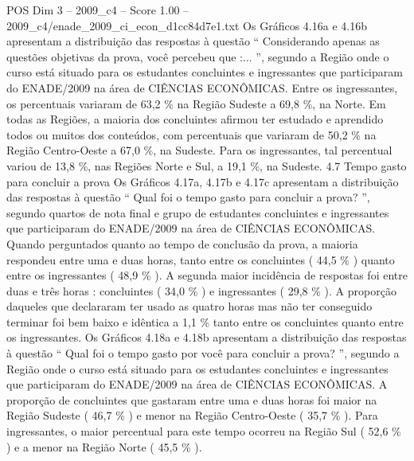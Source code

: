 \begin{textsample}{POS Dim 3 – 2009\_c4 – Score 1.00 – 2009\_c4/enade\_2009\_ci\_econ\_d1cc84d7e1.txt}
Os Gráficos 4.16a e 4.16b apresentam a distribuição das respostas à questão “ Considerando apenas as questões objetivas da prova, você percebeu que :... ”, segundo a Região onde o curso está situado para os estudantes concluintes e ingressantes que participaram do ENADE/2009 na área de CIÊNCIAS ECONÔMICAS.
Entre os ingressantes, os percentuais variaram de 63,2 \% na Região Sudeste a 69,8 \%, na Norte.
Em todas as Regiões, a maioria dos concluintes afirmou ter estudado e aprendido todos ou muitos dos conteúdos, com percentuais que variaram de 50,2 \% na Região Centro-Oeste a 67,0 \%, na Sudeste.
Para os ingressantes, tal percentual variou de 13,8 \%, nas Regiões Norte e Sul, a 19,1 \%, na Sudeste. 4.7 Tempo gasto para concluir a prova Os Gráficos 4.17a, 4.17b e 4.17c apresentam a distribuição das respostas à questão “ Qual foi o tempo gasto para concluir a prova? ”, segundo quartos de nota final e grupo de estudantes concluintes e ingressantes que participaram do ENADE/2009 na área de CIÊNCIAS ECONÔMICAS.
Quando perguntados quanto ao tempo de conclusão da prova, a maioria respondeu entre uma e duas horas, tanto entre os concluintes ( 44,5 \% ) quanto entre os ingressantes ( 48,9 \% ).
A segunda maior incidência de respostas foi entre duas e três horas : concluintes ( 34,0 \% ) e ingressantes ( 29,8 \% ).
A proporção daqueles que declararam ter usado as quatro horas mas não ter conseguido terminar foi bem baixo e idêntica a 1,1 \% tanto entre os concluintes quanto entre os ingressantes.
Os Gráficos 4.18a e 4.18b apresentam a distribuição das respostas à questão “ Qual foi o tempo gasto por você para concluir a prova? ”, segundo a Região onde o curso está situado para os estudantes concluintes e ingressantes que participaram do ENADE/2009 na área de CIÊNCIAS ECONÔMICAS.
A proporção de concluintes que gastaram entre uma e duas horas foi maior na Região Sudeste ( 46,7 \% ) e menor na Região Centro-Oeste ( 35,7 \% ).
Para ingressantes, o maior percentual para este tempo ocorreu na Região Sul ( 52,6 \% ) e a menor na Região Norte ( 45,5 \% ).

\end{textsample}
